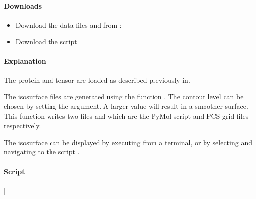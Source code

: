 \documentclass[a4paper,10pt,english,openany,oneside]{sphinxmanual}
\begin{document}
\paragraph{Downloads}
\label{\detokenize{examples/pcs_plot_isosurface:downloads}}\begin{itemize}
\item {} 
\sphinxAtStartPar
Download the data files  and  from :

\item {} 
\sphinxAtStartPar
Download the script 

\end{itemize}


\paragraph{Explanation}
\label{\detokenize{examples/pcs_plot_isosurface:explanation}}
\sphinxAtStartPar
The protein and tensor are loaded as described previously in.

\sphinxAtStartPar
The isosurface files are generated using the function {\hyperref[\detokenize{reference/generated/paramagpy.metal.Metal.isomap:paramagpy.metal.Metal.isomap}]{}}. The contour level can be chosen by setting the  argument. A larger  value will result in a smoother surface. This function writes two files  and  which are the PyMol script and PCS grid files respectively.

\sphinxAtStartPar
The isosurface can be displayed by executing  from a terminal, or by selecting  and navigating to the script .


\paragraph{Script}
\label{\detokenize{examples/pcs_plot_isosurface:script}}
\sphinxAtStartPar
{[}\sphinxcode{\sphinxupquote{pcs\_plot\_isosurface.py}}{]}
\end{document}
